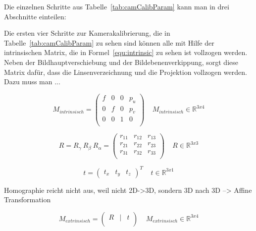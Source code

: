 Die einzelnen Schritte aus Tabelle~\ref{tab:camCalibParam} kann man in drei Abschnitte einteilen: 




Die ersten vier Schritte zur Kamerakalibrierung, die in Tabelle~\ref{tab:camCalibParam} zu sehen sind können alle mit Hilfe der intrinsischen Matrix, die in Formel~\ref{equ:intrinsic} zu sehen ist vollzogen werden. Neben der Bildhauptverschiebung und der Bildebenenverkippung, sorgt diese Matrix dafür, dass  die Linsenverzeichnung und die Projektion vollzogen werden. Dazu muss man ... 


\begin{equation}
\label{equ:intrinsic}
M_{intrinsisch} = 
\begin{pmatrix}
f & 0 & 0 & p_u \\
0 & f & 0 & p_v \\
0 & 0 & 1 & 0 \\
\end{pmatrix} 
~ ~ ~ ~ ~M_{intrinsisch} \in \mathbb{R}^{3x4}
\end{equation}



\begin{equation}
\label{equ:Rotation}
R= R_\gamma ~R_\beta ~R_\alpha =
\begin{pmatrix}
r_{11} & r_{12} & r_{13} \\
r_{21} & r_{22} & r_{23} \\
r_{31} & r_{32} & r_{33} \\
\end{pmatrix}
~ ~ ~ ~ ~R \in \mathbb{R}^{3x3}
\end{equation}



\begin{equation}
\label{equ:Rotation}
t=
\begin{pmatrix}
t_x & t_y & t_z
\end{pmatrix}^T
~ ~ ~ ~ ~t \in \mathbb{R}^{3x1} 
\end{equation}

Homographie reicht nicht aus, weil nicht 2D->3D, sondern 3D nach 3D --> Affine Transformation

\begin{equation}
\label{equ:extrinsic}
M_{extrinsisch}= 
\begin{pmatrix}
R &|& t \\
\end{pmatrix} 
~ ~ ~ ~ ~M_{extrinsisch} \in \mathbb{R}^{3x4}
\end{equation}





